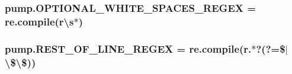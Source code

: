 \subsubsection[{\texorpdfstring{O\+P\+T\+I\+O\+N\+A\+L\+\_\+\+W\+H\+I\+T\+E\+\_\+\+S\+P\+A\+C\+E\+S\+\_\+\+R\+E\+G\+EX}{OPTIONAL_WHITE_SPACES_REGEX}}]{\setlength{\rightskip}{0pt plus 5cm}pump.\+O\+P\+T\+I\+O\+N\+A\+L\+\_\+\+W\+H\+I\+T\+E\+\_\+\+S\+P\+A\+C\+E\+S\+\_\+\+R\+E\+G\+EX = re.\+compile(r\textquotesingle{}\textbackslash{}s$\ast$\textquotesingle{})}\hypertarget{namespacepump_a81f03eaffd2c0f4c6a453a0b179e51ca}{}\label{namespacepump_a81f03eaffd2c0f4c6a453a0b179e51ca}
\subsubsection[{\texorpdfstring{R\+E\+S\+T\+\_\+\+O\+F\+\_\+\+L\+I\+N\+E\+\_\+\+R\+E\+G\+EX}{REST_OF_LINE_REGEX}}]{\setlength{\rightskip}{0pt plus 5cm}pump.\+R\+E\+S\+T\+\_\+\+O\+F\+\_\+\+L\+I\+N\+E\+\_\+\+R\+E\+G\+EX = re.\+compile(r\textquotesingle{}.$\ast$?(?=\$$\vert$\textbackslash{}\$\textbackslash{}\$)\textquotesingle{})}\hypertarget{namespacepump_a4c1f68b32fcb8366051b574cf2e6aef1}{}\label{namespacepump_a4c1f68b32fcb8366051b574cf2e6aef1}
